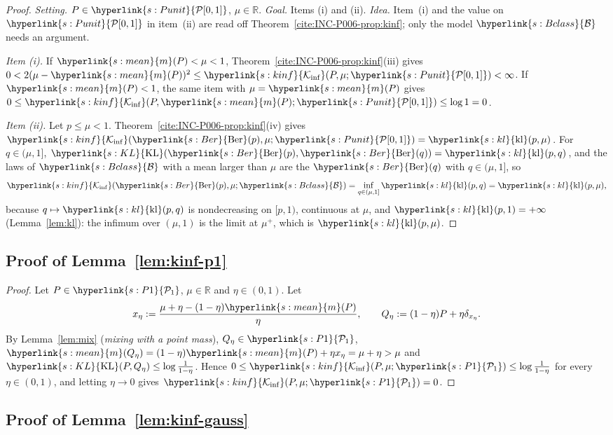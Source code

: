 \documentclass[11pt]{article}
\newcommand{\R}{\mathbb{R}}
\newcommand{\sy}[2]{{\hyperlink{#1}{#2}}}
\newcommand{\Pone}{\sy{s:P1}{\mathcal{P}_{1}}}
\newcommand{\mean}{\sy{s:mean}{m}}
\newcommand{\KL}{\sy{s:KL}{\mathrm{KL}}}
\newcommand{\kl}{\sy{s:kl}{\mathrm{kl}}}
\newcommand{\Ber}{\sy{s:Ber}{\mathrm{Ber}}}
\newcommand{\Kinf}{\sy{s:kinf}{\mathcal{K}_{\inf}}}
\newcommand{\Punit}{\sy{s:Punit}{\mathcal{P}[0,1]}}
\newcommand{\Bclass}{\sy{s:Bclass}{\mathcal{B}}}
\begin{document}
\begin{proof}
\emph{Setting.} $P\in\Punit$, $\mu\in\R$. \emph{Goal.} Items (i) and (ii). \emph{Idea.} Item~(i) and
the value on $\Punit$ in item~(ii) are read off Theorem~\ref{cite:INC-P006-prop:kinf}; only the
model $\Bclass$ needs an argument.

\emph{Item (i).} If $\mean(P)<\mu<1$, Theorem~\ref{cite:INC-P006-prop:kinf}(iii) gives
$0<2(\mu-\mean(P))^2\le\Kinf(P,\mu;\Punit)<\infty$. If $\mean(P)<1$, the same item with
$\mu=\mean(P)$ gives $0\le\Kinf(P,\mean(P);\Punit)\le\log1=0$.

\emph{Item (ii).} Let $p\le\mu<1$. Theorem~\ref{cite:INC-P006-prop:kinf}(iv) gives
$\Kinf(\Ber(p),\mu;\Punit)=\kl(p,\mu)$. For $q\in(\mu,1]$, $\KL(\Ber(p),\Ber(q))=\kl(p,q)$, and the laws of
$\Bclass$ with a mean larger than $\mu$ are the $\Ber(q)$ with $q\in(\mu,1]$, so
\begin{equation*}
  \Kinf(\Ber(p),\mu;\Bclass)=\inf_{q\in(\mu,1]}\kl(p,q)=\kl(p,\mu),
\end{equation*}
because $q\mapsto\kl(p,q)$ is nondecreasing on $[p,1)$, continuous at $\mu$, and $\kl(p,1)=+\infty$
(Lemma~\ref{lem:kl}): the infimum over $(\mu,1)$ is the limit at $\mu^+$, which is $\kl(p,\mu)$.
\end{proof}

\subsection{Proof of Lemma~\ref{lem:kinf-p1}}\label{sec:proof-kinf-p1}

\begin{proof}
Let $P\in\Pone$, $\mu\in\R$ and $\eta\in(0,1)$. Let
\begin{equation*}
  x_\eta:=\frac{\mu+\eta-(1-\eta)\mean(P)}{\eta},\qquad
  Q_\eta:=(1-\eta)P+\eta\delta_{x_\eta}.
\end{equation*}
By Lemma~\ref{lem:mix} (\emph{mixing with a point mass}), $Q_\eta\in\Pone$,
$\mean(Q_\eta)=(1-\eta)\mean(P)+\eta x_\eta=\mu+\eta>\mu$ and
$\KL(P,Q_\eta)\le\log\frac1{1-\eta}$. Hence $0\le\Kinf(P,\mu;\Pone)\le\log\frac1{1-\eta}$
for every $\eta\in(0,1)$, and letting $\eta\to0$ gives $\Kinf(P,\mu;\Pone)=0$.
\end{proof}

\subsection{Proof of Lemma~\ref{lem:kinf-gauss}}\label{sec:proof-kinf-gauss}
\end{document}
